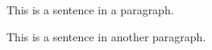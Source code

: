 \documentclass{article}
\begin{document}
This is a sentence in a paragraph.

This is a sentence in another paragraph.
\end{document}
